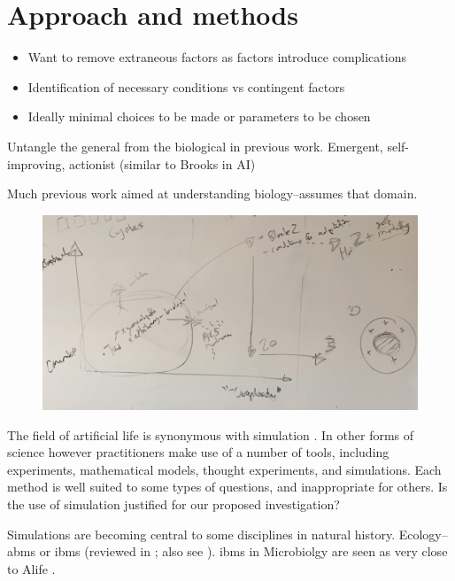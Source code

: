 \section{Approach and methods}\label{approach}

\begin{itemize}
	\item
	      Want to remove extraneous factors as factors introduce complications
	\item
	      Identification of necessary conditions vs contingent factors
	\item
	      Ideally minimal choices to be made or parameters to be chosen
\end{itemize}

Untangle the general from the biological in previous work. Emergent, self-improving, actionist (similar to Brooks in AI)

Much previous work aimed at understanding biology--assumes that domain.

\begin{figure}
	\begin{center}
		\includegraphics[width=\linewidth]{figures/approach}
	\end{center}
\end{figure}


The field of artificial life is synonymous with simulation
\autocite[chap.2]{Aicardi2010}. In other forms of science however
practitioners make use of a number of tools, including experiments,
mathematical models, thought experiments, and simulations.
Each method is well suited to some types of
questions, and inappropriate for others. Is the use of simulation
justified for our proposed investigation?

Simulations are becoming central to some disciplines in natural history.
Ecology--\glspl{abm} or \glspl{ibm} (reviewed in
\autocite{DeAngelis2005}; also see
\autocite{Grimm:2006fk,Grimm:2005wd,Grimm:1999kf,Hogeweg:1990jz}).
\glspl{ibm} in Microbiolgy are seen as very close to Alife \autocite{Grimm:2009th}.


